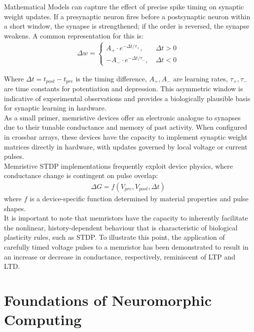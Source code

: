 \noindent Mathematical Models can capture the effect of precise spike timing on synaptic weight updates. If a presynaptic neuron fires before a postsynaptic neuron within a short window, the synapse is strengthened; if the order is reversed, the synapse weakens. A common representation for this is:
\begin{align}
\Delta w = \left\{ \begin{array}{cl}
    A_+ \cdot e^{-\Delta t/\tau_+}, & \ \Delta t > 0 \\
    -A_- \cdot e^{-\Delta t/\tau_-}, & \ \Delta t < 0
    \end{array} \right. \label{eq:1.20}
\end{align}

\noindent Where $\Delta t = t_{post} - t_{pre}$ is the timing difference, $A_+, A_-$ are learning rates, $\tau_+, \tau_-$ are time constants for potentiation and depression. This asymmetric window is indicative of experimental observations and provides a biologically plausible basis for synaptic learning in hardware.\\

\noindent As a small primer, memristive devices offer an electronic analogue to synapses due to their tunable conductance and memory of past activity. When configured in crossbar arrays, these devices have the capacity to implement synaptic weight matrices directly in hardware, with updates governed by local voltage or current pulses.\\

\noindent Memristive STDP implementations frequently exploit device physics, where conductance change is contingent on pulse overlap:
\begin{align}
    \Delta G = f(V_{pre}, V_{post}, \Delta t) \label{eq:1.21}
\end{align}
\noindent where $f$ is a device-specific function determined by material properties and pulse shapes. \\

\noindent It is important to note that memristors have the capacity to inherently facilitate the nonlinear, history-dependent behaviour that is characteristic of biological plasticity rules, such as STDP. To illustrate this point, the application of carefully timed voltage pulses to a memristor has been demonstrated to result in an increase or decrease in conductance, respectively, reminiscent of LTP and LTD.

\section[Foundations of Neuromorphic Computing]{Foundations of Neuromorphic Computing}

